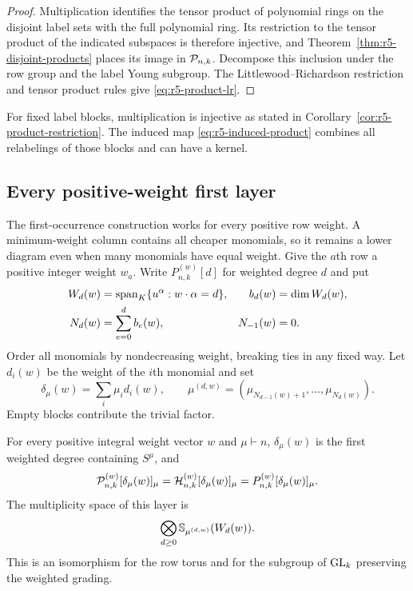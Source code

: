 \begin{proof}
Multiplication identifies the tensor product of polynomial rings on
the disjoint label sets with the full polynomial ring.  Its
restriction to the tensor product of the indicated subspaces is
therefore injective, and Theorem~\ref{thm:r5-disjoint-products}
places its image in $\mathcal P_{n,k}$.  Decompose this inclusion under
the row group and the label Young subgroup.  The
Littlewood--Richardson restriction and tensor product rules give
\eqref{eq:r5-product-lr}.
\end{proof}

For fixed label blocks, multiplication is injective as stated in
Corollary~\ref{cor:r5-product-restriction}.  The induced map
\eqref{eq:r5-induced-product} combines all relabelings of those
blocks and can have a kernel.

\subsection{Every positive-weight first layer}
\label{sec:r5-weighted}

The first-occurrence construction works for every positive row
weight.  A minimum-weight column contains all cheaper monomials,
so it remains a lower diagram even when many monomials have equal
weight.  Give the $a$th row a positive integer weight $w_a$.  Write
$P_{n,k}^{(w)}[d]$ for weighted degree $d$ and put
\[
 \begin{aligned}
 W_d(w)&=\operatorname{span}_K\{u^\alpha:w\cdot\alpha=d\},
 &b_d(w)&=\dim W_d(w),\\
 N_d(w)&=\sum_{e=0}^d b_e(w),
 &N_{-1}(w)&=0.
 \end{aligned}
\]
Order all monomials by nondecreasing weight, breaking ties in any
fixed way.  Let $d_i(w)$ be the weight of the $i$th monomial and set
\[
 \delta_\mu(w)=\sum_i\mu_i d_i(w),\qquad
 \mu^{(d,w)}=
  (\mu_{N_{d-1}(w)+1},\ldots,\mu_{N_d(w)}).
\]
Empty blocks contribute the trivial factor.

\begin{theorem}
\label{thm:r5-weighted-first}
For every positive integral weight vector $w$ and $\mu\vdash n$,
$\delta_\mu(w)$ is the first weighted degree containing $S^\mu$, and
\begin{equation}\label{eq:r5-weighted-equality}
 \mathcal P_{n,k}^{(w)}[\delta_\mu(w)]_\mu
 =\mathcal H_{n,k}^{(w)}[\delta_\mu(w)]_\mu
 =P_{n,k}^{(w)}[\delta_\mu(w)]_\mu.
\end{equation}
The multiplicity space of this layer is
\begin{equation}\label{eq:r5-weighted-character}
                  \bigotimes_{d\geq0}
                         \mathbb S_{\mu^{(d,w)}}(W_d(w)).
\end{equation}
This is an isomorphism for the row torus and for the subgroup of
$\operatorname{GL}_k$ preserving the weighted grading.
\end{theorem}

